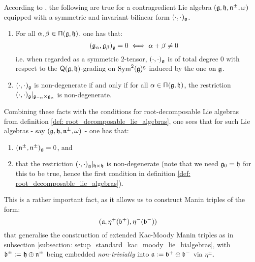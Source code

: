         \begin{remark} \label{remark: isotropic_subalgebras_of_root_decomopsable_lie_algebras}
            According to \cite[Proposition 4.4.2]{moody_pianzola_lie_algebras_with_triangular_decompositions}, the following are true for a contragredient Lie algebra $(\mathfrak{g}, \mathfrak{h}, \mathfrak{n}^{\pm}, \omega)$ equipped with a symmetric and invariant bilinear form $(\cdot, \cdot)_{\mathfrak{g}}$.
            \begin{enumerate}
                \item For all $\alpha, \beta \in \mathsf{\Pi}(\mathfrak{g}, \mathfrak{h})$, one has that:
                    $$( \mathfrak{g}_{\alpha}, \mathfrak{g}_{\beta} )_{\mathfrak{g}} = 0 \iff \alpha + \beta \not = 0$$
                i.e. when regarded as a symmetric $2$-tensor, $(\cdot, \cdot)_{\mathfrak{g}}$ is of total degree $0$ with respect to the $\mathsf{Q}(\mathfrak{g}, \mathfrak{h})$-grading on $\operatorname{Sym}^2(\mathfrak{g})^{\mathfrak{g}}$ induced by the one on $\mathfrak{g}$.
                \item $(\cdot, \cdot)_{\mathfrak{g}}$ is non-degenerate if and only if for all $\alpha \in \mathsf{\Pi}(\mathfrak{g}, \mathfrak{h})$, the restriction $(\cdot, \cdot)_{\g}|_{\g_{-\alpha} \x \g_{\alpha}}$ is non-degenerate.
            \end{enumerate}

            Combining these facts with the conditions for root-decomposable Lie algebras from definition \ref{def: root_decomposable_lie_algebras}, one sees that for such Lie algebras - say $(\mathfrak{g}, \mathfrak{h}, \mathfrak{n}^{\pm}, \omega)$ - one has that:
            \begin{enumerate}
                \item $(\mathfrak{n}^{\pm}, \mathfrak{n}^{\pm})_{\mathfrak{g}} = 0$, and
                \item that the restriction $(\cdot, \cdot)_{\g}|_{\h \x \h}$ is non-degenerate (note that we need $\mathfrak{g}_0 = \mathfrak{h}$ for this to be true, hence the first condition in definition \ref{def: root_decomposable_lie_algebras}).
            \end{enumerate}
            This is a rather important fact, as it allows us to construct Manin triples of the form:
                $$(\mathfrak{a}, \eta^+(\mathfrak{b}^+), \eta^-(\mathfrak{b}^-))$$
            that generalise the construction of extended Kac-Moody Manin triples as in subsection \ref{subsection: setup_standard_kac_moody_lie_bialgebras}, with $\mathfrak{b}^{\pm} := \mathfrak{h} \oplus \mathfrak{n}^{\pm}$ being embedded \textit{non-trivially} into $\mathfrak{a} := \mathfrak{b}^+ \oplus \mathfrak{b}^-$ via $\eta^{\pm}$.
        \end{remark}

